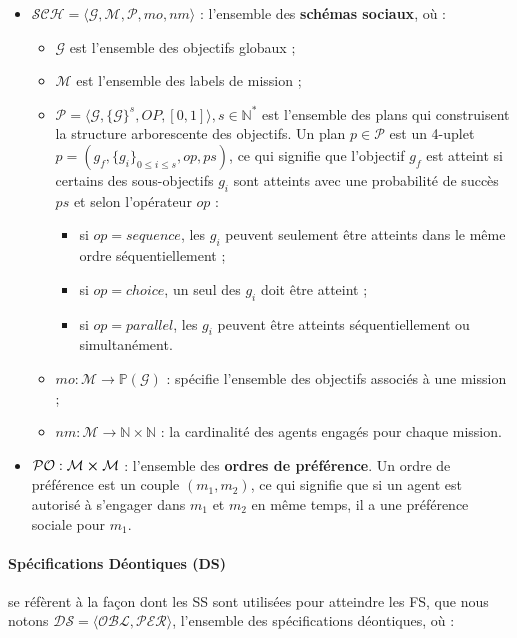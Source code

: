 \documentclass[sigconf,anonymous]{aamas}
\begin{document}
\begin{itemize}
    \item $\mathcal{SCH} = \langle\mathcal{G}, \mathcal{M}, \mathcal{P}, mo, nm \rangle$ : l'ensemble des \textbf{schémas sociaux}, où :
          \begin{itemize}
              \item $\mathcal{G}$ est l'ensemble des objectifs globaux ;
              \item $\mathcal{M}$ est l'ensemble des labels de mission ;
              \item $\mathcal{P} = \langle \mathcal{G}, \{\mathcal{G}\}^s, OP, [0,1] \rangle, s \in \mathbb{N}^*$ est l'ensemble des plans qui construisent la structure arborescente des objectifs. Un plan $p \in \mathcal{P}$ est un 4-uplet $p=(g_f,\{g_i\}_{0 \leq i \leq s}, op, ps)$, ce qui signifie que l'objectif $g_f$ est atteint si certains des sous-objectifs $g_i$ sont atteints avec une probabilité de succès $ps$ et selon l'opérateur $op$ :
                    \begin{itemize}
                        \item si $op = sequence$, les $g_i$ peuvent seulement être atteints dans le même ordre séquentiellement ;
                        \item si $op = choice$, un seul des $g_i$ doit être atteint ;
                        \item si $op = parallel$, les $g_i$ peuvent être atteints séquentiellement ou simultanément.
                    \end{itemize}
              \item $mo : \mathcal{M} \rightarrow \mathbb{P}(\mathcal{G})$ : spécifie l'ensemble des objectifs associés à une mission ;
              \item $nm : \mathcal{M} \rightarrow \mathbb{N} \times \mathbb{N}$ : la cardinalité des agents engagés pour chaque mission.
          \end{itemize}
    \item $\mathcal{PO} : \mathcal{M} \cross \mathcal{M}$ : l'ensemble des \textbf{ordres de préférence}. Un ordre de préférence est un couple $(m_1, m_2)$, ce qui signifie que si un agent est autorisé à s'engager dans $m_1$ et $m_2$ en même temps, il a une préférence sociale pour $m_1$.
\end{itemize}

\paragraph{\textbf{Spécifications Déontiques (DS)}} se réfèrent à la façon dont les SS sont utilisées pour atteindre les FS, que nous notons $\mathcal{DS} = \langle \mathcal{OBL}, \mathcal{PER} \rangle$, l'ensemble des spécifications déontiques, où :
\end{document}
